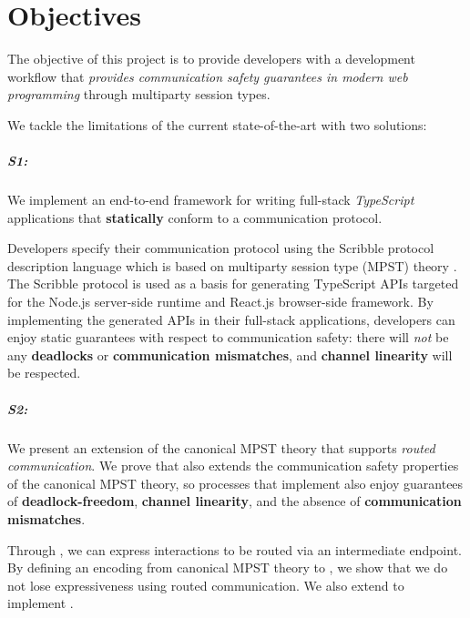 \section{Objectives}

The objective of this project is to provide
developers with a development workflow
that \textit{provides communication safety guarantees in modern
web programming} through multiparty session types.

We tackle the limitations of the current
state-of-the-art with two solutions:

\subparagraph{S1: \codegen}
We implement an end-to-end framework
for writing full-stack \textit{TypeScript} applications that
\textbf{statically} conform to a communication protocol.

Developers specify their communication protocol using
the Scribble protocol description language \cite{Scribble}
which is based on multiparty session type (MPST) theory \cite{MPST}.
The Scribble protocol is used as a basis for generating
TypeScript APIs targeted for the Node.js server-side runtime
and React.js browser-side framework.
By implementing the generated APIs in their full-stack applications,
developers can enjoy static guarantees with respect 
to communication safety: 
there will \textit{not} be any \textbf{deadlocks} or
\textbf{communication mismatches},
and \textbf{channel linearity} will be respected.

\subparagraph{S2: \newtheory}
We present an extension of the canonical MPST
theory that supports \textit{routed communication}.
We prove that \newtheory also extends the communication safety
properties of the canonical MPST theory, so
processes that implement \newtheory also enjoy
guarantees of \textbf{deadlock-freedom}, \textbf{channel linearity},
and the absence
of \textbf{communication mismatches}.

Through \newtheory, we can express interactions to be
routed via an intermediate endpoint.
By defining an encoding from canonical MPST theory
to \newtheory, we show that we do not lose expressiveness
using routed communication.
We also extend \codegen to implement \newtheory.
\\

